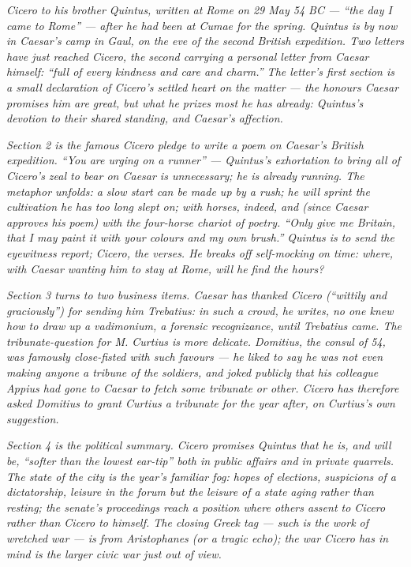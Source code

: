 
\textit{Cicero to his brother Quintus, written at Rome on 29 May
54 BC --- ``the day I came to Rome'' --- after he had been at
Cumae for the spring. Quintus is by now in Caesar's camp in Gaul,
on the eve of the second British expedition. Two letters have just
reached Cicero, the second carrying a personal letter from Caesar
himself: ``full of every kindness and care and charm.'' The
letter's first section is a small declaration of Cicero's settled
heart on the matter --- the honours Caesar promises him are
great, but what he prizes most he has already: Quintus's devotion
to their shared standing, and Caesar's affection.}

\textit{Section 2 is the famous Cicero pledge to write a poem on
Caesar's British expedition. ``You are urging on a runner''
--- Quintus's exhortation to bring all of Cicero's zeal to bear
on Caesar is unnecessary; he is already running. The metaphor
unfolds: a slow start can be made up by a rush; he will sprint
the cultivation he has too long slept on; with horses, indeed,
and (since Caesar approves his poem) with the four-horse chariot
of poetry. ``Only give me Britain, that I may paint it with your
colours and my own brush.'' Quintus is to send the eyewitness
report; Cicero, the verses. He breaks off self-mocking on time:
where, with Caesar wanting him to stay at Rome, will he find
the hours?}

\textit{Section 3 turns to two business items. Caesar has thanked
Cicero (``wittily and graciously'') for sending him Trebatius:
in such a crowd, he writes, no one knew how to draw up a
\textit{vadimonium}, a forensic recognizance, until Trebatius
came. The tribunate-question for M. Curtius is more delicate.
Domitius, the consul of 54, was famously close-fisted with such
favours --- he liked to say he was not even making anyone a
tribune of the soldiers, and joked publicly that his colleague
Appius had gone to Caesar to fetch some tribunate or other.
Cicero has therefore asked Domitius to grant Curtius a tribunate
for the year after, on Curtius's own suggestion.}

\textit{Section 4 is the political summary. Cicero promises
Quintus that he is, and will be, ``softer than the lowest
ear-tip'' both in public affairs and in private quarrels. The
state of the city is the year's familiar fog: hopes of elections,
suspicions of a dictatorship, leisure in the forum but the
leisure of a state aging rather than resting; the senate's
proceedings reach a position where others assent to Cicero rather
than Cicero to himself. The closing Greek tag --- \textit{such is
the work of wretched war} --- is from Aristophanes (or a tragic
echo); the war Cicero has in mind is the larger civic war just
out of view.}
